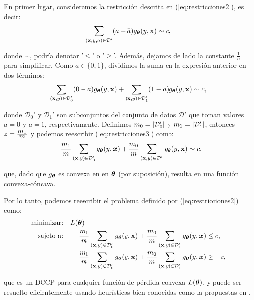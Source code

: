 \documentclass[oneside,openright,titlepage,numbers=noenddot,openany,headinclude,footinclude=true,
cleardoublepage=empty,abstractoff,BCOR=5mm,paper=a4,fontsize=12pt,main=spanish]{scrreprt}
\begin{document}
En primer lugar, consideramos la restricción descrita en (\ref{eq:restricciones2}), es decir:
\begin{equation*}
\sum_{(\textbf{x},y,a)\in \mathcal{D}'} (a-\bar{a})g_{\bm{\theta}} (y,\textbf{x}) \sim c,
\end{equation*}

donde $\sim$, podría denotar '$\leq$' o '$\geq$'. Además, dejamos de lado la constante $\frac{1}{n}$ para simplificar. Como $a \in \{0,1\}$, dividimos la suma en la expresión anterior en dos términos:
\begin{equation} \label{eq:restricciones3}
\sum_{(\textbf{x},y)\in \mathcal{D}_0'} (0-\bar{a})g_{\bm{\theta}} (y,\textbf{x})+\sum_{(\textbf{x},y)\in \mathcal{D}_1'} (1-\bar{a})g_{\bm{\theta}} (y,\textbf{x}) \sim c,
\end{equation}

donde $\mathcal{D}_0'$ y $\mathcal{D}_1'$ son subconjuntos del conjunto de datos $\mathcal{D'}$ que toman valores $a=0$ y $a=1$, respectivamente. Definimos $m_0=\left\lvert\mathcal{D}_0'\right\rvert$ y $m_1=\left\lvert\mathcal{D}_1'\right\rvert$, entonces $\bar{z}=\frac{\displaystyle m_1}{\displaystyle m}$ y podemos reescribir (\ref{eq:restricciones3}) como:
\begin{equation*}
-\frac{\displaystyle m_1}{\displaystyle m} \sum_{(\textbf{x},y)\in \mathcal{D}_0'} g_{\bm{\theta}} (y,\bm{x})+\frac{\displaystyle m_0}{\displaystyle m} \sum_{(\textbf{x},y)\in \mathcal{D}_1'} g_{\bm{\theta}} (y,\textbf{x}) \sim c,
\end{equation*}

que, dado que $g_{\bm{\theta}}$ es convexa en en $\bm{\theta}$ (por suposición), resulta en una función convexa-cóncava. 

Por lo tanto, podemos reescribir el problema definido por (\ref{eq:restricciones2}) como:
\begin{equation*}
\begin{split}
\text{minimizar:} &\quad L(\bm{\theta})\\
\text{sujeto a:} &\quad
-\frac{m_1}{m} \sum_{(\textbf{x},y)\in \mathcal D_0'} g_{\bm{\theta}}(y,\textbf{x}) +\frac{m_0}{m} \sum_{(\textbf{x},y)\in \mathcal D_1'} g_{\bm{\theta}}(y,\bm{x}) \leq c,\\
&\quad -\frac{m_1}{m} \sum_{(\textbf{x},y)\in \mathcal D_0'} g_{\bm{\theta}}(y,\textbf{x})+\frac{m_0}{m} \sum_{(\textbf{x},y)\in \mathcal D_1'} g_{\bm{\theta}}(y,\bm{x}) \geq -c,
\end{split}
\end{equation*}

que es un DCCP para cualquier función de pérdida convexa $L(\bm{\theta})$, y puede ser resuelto eficientemente usando heurísticas bien conocidas como la propuestas en \cite{convex2016}. 
\end{document}
